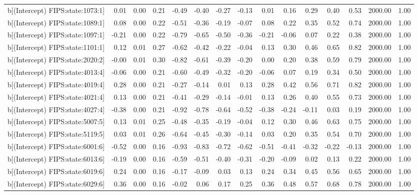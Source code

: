 \begin{table}[ht]
\begin{tabular}{rrrrrrrrrrrrrrr}
  b[(Intercept) FIPS:state:1073:1] & 0.01 & 0.00 & 0.21 & -0.49 & -0.40 & -0.27 & -0.13 & 0.01 & 0.16 & 0.29 & 0.40 & 0.53 & 2000.00 & 1.00 \\ 
  b[(Intercept) FIPS:state:1089:1] & 0.08 & 0.00 & 0.22 & -0.51 & -0.36 & -0.19 & -0.07 & 0.08 & 0.22 & 0.35 & 0.52 & 0.74 & 2000.00 & 1.00 \\ 
  b[(Intercept) FIPS:state:1097:1] & -0.21 & 0.00 & 0.22 & -0.79 & -0.65 & -0.50 & -0.36 & -0.21 & -0.06 & 0.07 & 0.22 & 0.38 & 2000.00 & 1.00 \\ 
  b[(Intercept) FIPS:state:1101:1] & 0.12 & 0.01 & 0.27 & -0.62 & -0.42 & -0.22 & -0.04 & 0.13 & 0.30 & 0.46 & 0.65 & 0.82 & 2000.00 & 1.00 \\ 
  b[(Intercept) FIPS:state:2020:2] & -0.00 & 0.01 & 0.30 & -0.82 & -0.61 & -0.39 & -0.20 & 0.00 & 0.20 & 0.38 & 0.59 & 0.79 & 2000.00 & 1.00 \\ 
  b[(Intercept) FIPS:state:4013:4] & -0.06 & 0.00 & 0.21 & -0.60 & -0.49 & -0.32 & -0.20 & -0.06 & 0.07 & 0.19 & 0.34 & 0.50 & 2000.00 & 1.00 \\ 
  b[(Intercept) FIPS:state:4019:4] & 0.28 & 0.00 & 0.21 & -0.27 & -0.14 & 0.01 & 0.13 & 0.28 & 0.42 & 0.56 & 0.71 & 0.82 & 2000.00 & 1.00 \\ 
  b[(Intercept) FIPS:state:4021:4] & 0.13 & 0.00 & 0.21 & -0.41 & -0.29 & -0.14 & -0.01 & 0.13 & 0.26 & 0.40 & 0.55 & 0.73 & 2000.00 & 1.00 \\ 
  b[(Intercept) FIPS:state:4027:4] & -0.38 & 0.00 & 0.21 & -0.92 & -0.78 & -0.64 & -0.52 & -0.38 & -0.24 & -0.11 & 0.03 & 0.19 & 2000.00 & 1.00 \\ 
  b[(Intercept) FIPS:state:5007:5] & 0.13 & 0.01 & 0.25 & -0.48 & -0.35 & -0.19 & -0.04 & 0.12 & 0.30 & 0.46 & 0.63 & 0.75 & 2000.00 & 1.00 \\ 
  b[(Intercept) FIPS:state:5119:5] & 0.03 & 0.01 & 0.26 & -0.64 & -0.45 & -0.30 & -0.14 & 0.03 & 0.20 & 0.35 & 0.54 & 0.70 & 2000.00 & 1.00 \\ 
  b[(Intercept) FIPS:state:6001:6] & -0.52 & 0.00 & 0.16 & -0.93 & -0.83 & -0.72 & -0.62 & -0.51 & -0.41 & -0.32 & -0.22 & -0.13 & 2000.00 & 1.00 \\ 
  b[(Intercept) FIPS:state:6013:6] & -0.19 & 0.00 & 0.16 & -0.59 & -0.51 & -0.40 & -0.31 & -0.20 & -0.09 & 0.02 & 0.13 & 0.22 & 2000.00 & 1.00 \\ 
  b[(Intercept) FIPS:state:6019:6] & 0.24 & 0.00 & 0.16 & -0.17 & -0.09 & 0.03 & 0.13 & 0.24 & 0.34 & 0.45 & 0.56 & 0.65 & 2000.00 & 1.00 \\ 
  b[(Intercept) FIPS:state:6029:6] & 0.36 & 0.00 & 0.16 & -0.02 & 0.06 & 0.17 & 0.25 & 0.36 & 0.48 & 0.57 & 0.68 & 0.78 & 2000.00 & 1.00 \\ 

\end{tabular}
\end{table}
